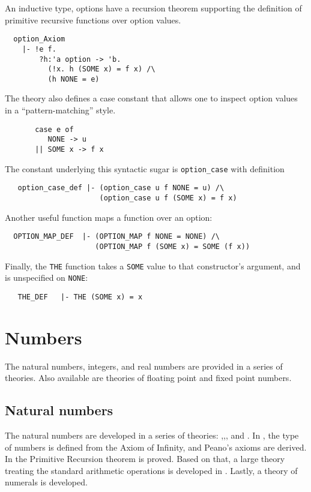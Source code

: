 An inductive type, options have a recursion theorem supporting the
definition of primitive recursive functions over option values.
%
{\small
\begin{verbatim}
  option_Axiom
    |- !e f.
        ?h:'a option -> 'b.
          (!x. h (SOME x) = f x) /\
          (h NONE = e)
\end{verbatim}
}
The  theory also defines a case constant that allows
one to inspect option values in a ``pattern-matching'' style.
{\small
\begin{verbatim}
       case e of
          NONE -> u
       || SOME x -> f x
\end{verbatim}
}
\noindent
The constant underlying this syntactic sugar is \verb+option_case+
with definition
{\small
\begin{verbatim}
   option_case_def |- (option_case u f NONE = u) /\
                      (option_case u f (SOME x) = f x)
\end{verbatim}
}
\noindent
Another useful function maps a function over an option:
{\small
\begin{verbatim}
  OPTION_MAP_DEF  |- (OPTION_MAP f NONE = NONE) /\
                     (OPTION_MAP f (SOME x) = SOME (f x))
\end{verbatim}
}
Finally, the {\small\verb+THE+} function takes a {\small\verb+SOME+}
value to that constructor's argument, and is unspecified on
{\small\verb+NONE+}:
{\small
\begin{verbatim}
   THE_DEF   |- THE (SOME x) = x
\end{verbatim}
}

\section{Numbers}

The natural numbers, integers, and real numbers are provided in a
series of theories. Also available are theories of floating point and
fixed point numbers.

\subsection{Natural numbers}

The natural numbers are developed in a series of theories:
\theoryimp{num},,, and
. In , the type of numbers is
defined from the Axiom of Infinity, and Peano's axioms are derived. In
\theoryimp{prim\_rec} the Primitive Recursion theorem is proved. Based
on that, a large theory treating the standard arithmetic operations is
developed in \theoryimp{arithmetic}. Lastly, a theory of numerals is developed.

